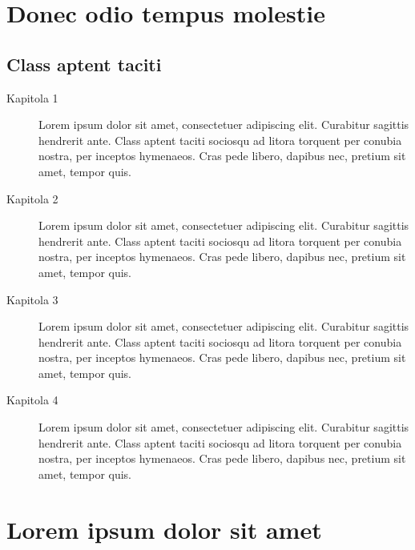 \section{Donec odio tempus molestie}

\lipsum[2] \cite{def:1, def:2}

\subsection{Class aptent taciti}

\lipsum[2-3]

\begin{description}
\item[Kapitola 1] Lorem ipsum dolor sit amet, consectetuer adipiscing elit. Curabitur sagittis hendrerit ante. Class aptent taciti sociosqu ad litora torquent per conubia nostra, per inceptos hymenaeos. Cras pede libero, dapibus nec, pretium sit amet, tempor quis.

\item[Kapitola 2] Lorem ipsum dolor sit amet, consectetuer adipiscing elit. Curabitur sagittis hendrerit ante. Class aptent taciti sociosqu ad litora torquent per conubia nostra, per inceptos hymenaeos. Cras pede libero, dapibus nec, pretium sit amet, tempor quis.

\item[Kapitola 3] Lorem ipsum dolor sit amet, consectetuer adipiscing elit. Curabitur sagittis hendrerit ante. Class aptent taciti sociosqu ad litora torquent per conubia nostra, per inceptos hymenaeos. Cras pede libero, dapibus nec, pretium sit amet, tempor quis.

\item[Kapitola 4] Lorem ipsum dolor sit amet, consectetuer adipiscing elit. Curabitur sagittis hendrerit ante. Class aptent taciti sociosqu ad litora torquent per conubia nostra, per inceptos hymenaeos. Cras pede libero, dapibus nec, pretium sit amet, tempor quis.
\end{description}

\lipsum[2]

\section{Lorem ipsum dolor sit amet}

\lipsum[3-5]
